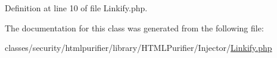 Definition at line 10 of file Linkify.\+php.



The documentation for this class was generated from the following file\+:\begin{DoxyCompactItemize}
\item 
classes/security/htmlpurifier/library/\+H\+T\+M\+L\+Purifier/\+Injector/\hyperlink{Linkify_8php}{Linkify.\+php}\end{DoxyCompactItemize}
